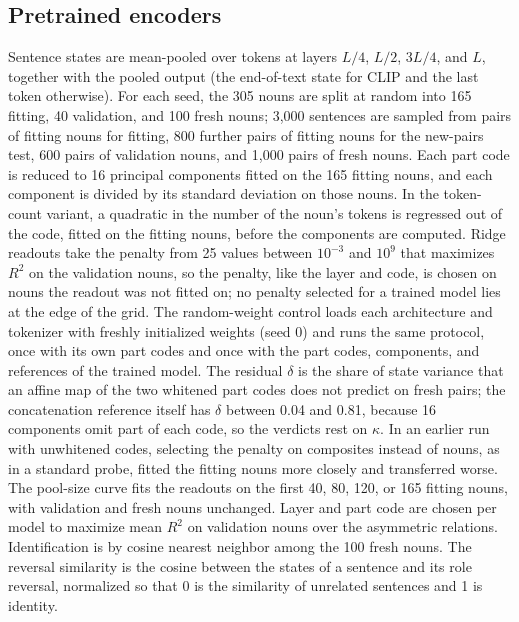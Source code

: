 \documentclass[10pt]{article}
\theoremstyle{plain}
\theoremstyle{remark}
\begin{document}
\subsection{Pretrained encoders}
Sentence states are mean-pooled over tokens at layers $L/4$, $L/2$, $3L/4$, and $L$, together with the pooled output (the end-of-text state for CLIP and the last token otherwise). For each seed, the 305 nouns are split at random into 165 fitting, 40 validation, and 100 fresh nouns; 3{,}000 sentences are sampled from pairs of fitting nouns for fitting, 800 further pairs of fitting nouns for the new-pairs test, 600 pairs of validation nouns, and 1{,}000 pairs of fresh nouns. Each part code is reduced to 16 principal components fitted on the 165 fitting nouns, and each component is divided by its standard deviation on those nouns. In the token-count variant, a quadratic in the number of the noun's tokens is regressed out of the code, fitted on the fitting nouns, before the components are computed. Ridge readouts take the penalty from 25 values between $10^{-3}$ and $10^{9}$ that maximizes $R^2$ on the validation nouns, so the penalty, like the layer and code, is chosen on nouns the readout was not fitted on; no penalty selected for a trained model lies at the edge of the grid. The random-weight control loads each architecture and tokenizer with freshly initialized weights (seed 0) and runs the same protocol, once with its own part codes and once with the part codes, components, and references of the trained model. The residual $\delta$ is the share of state variance that an affine map of the two whitened part codes does not predict on fresh pairs; the concatenation reference itself has $\delta$ between 0.04 and 0.81, because 16 components omit part of each code, so the verdicts rest on $\kappa$. In an earlier run with unwhitened codes, selecting the penalty on composites instead of nouns, as in a standard probe, fitted the fitting nouns more closely and transferred worse. The pool-size curve fits the readouts on the first 40, 80, 120, or 165 fitting nouns, with validation and fresh nouns unchanged. Layer and part code are chosen per model to maximize mean $R^2$ on validation nouns over the asymmetric relations. Identification is by cosine nearest neighbor among the 100 fresh nouns. The reversal similarity is the cosine between the states of a sentence and its role reversal, normalized so that 0 is the similarity of unrelated sentences and 1 is identity.
\end{document}
